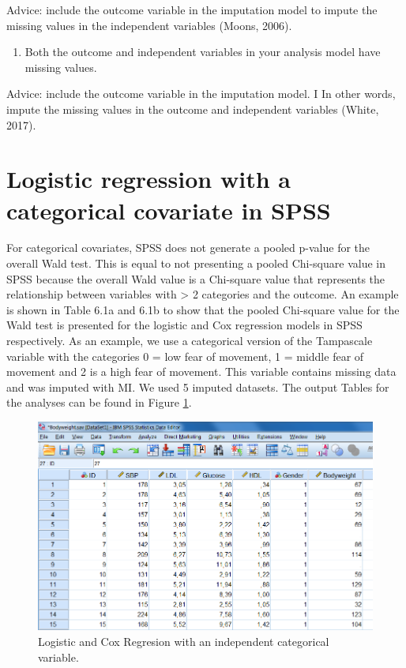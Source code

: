 \documentclass[]{book}
\providecommand{\tightlist}{%
  \setlength{\itemsep}{0pt}\setlength{\parskip}{0pt}}
\begin{document}
Advice: include the outcome variable in the imputation model to impute
the missing values in the independent variables (Moons, 2006).

\begin{enumerate}
\def\labelenumi{\arabic{enumi}.}
\setcounter{enumi}{1}
\tightlist
\item
  Both the outcome and independent variables in your analysis model have
  missing values.
\end{enumerate}

Advice: include the outcome variable in the imputation model. I In other
words, impute the missing values in the outcome and independent
variables (White, 2017).

\section{Logistic regression with a categorical covariate in
SPSS}\label{logistic-regression-with-a-categorical-covariate-in-spss}

For categorical covariates, SPSS does not generate a pooled p-value for
the overall Wald test. This is equal to not presenting a pooled
Chi-square value in SPSS because the overall Wald value is a Chi-square
value that represents the relationship between variables with
\textgreater{} 2 categories and the outcome. An example is shown in
Table 6.1a and 6.1b to show that the pooled Chi-square value for the
Wald test is presented for the logistic and Cox regression models in
SPSS respectively. As an example, we use a categorical version of the
Tampascale variable with the categories 0 = low fear of movement, 1 =
middle fear of movement and 2 is a high fear of movement. This variable
contains missing data and was imputed with MI. We used 5 imputed
datasets. The output Tables for the analyses can be found in Figure
\ref{fig:fig6-1}.

\begin{figure}

{\centering \includegraphics[width=0.9\linewidth]{images/fig6.1} 

}

\caption{Logistic and Cox Regresion with an independent categorical variable.}\label{fig:fig6-1}
\end{figure}
\end{document}

